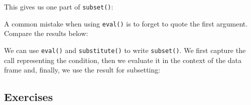 This gives us one part of \texttt{subset()}:

\begin{Shaded}
\begin{Highlighting}[]
\NormalTok{(}\StringTok{ }
\NormalTok{(}\StringTok{ }
\end{Highlighting}
\end{Shaded}

A common mistake when using \texttt{eval()} is to forget to quote the
first argument. Compare the results below:

\begin{Shaded}
\begin{Highlighting}[]
\StringTok{ }
\NormalTok{(}

\NormalTok{(}
\end{Highlighting}
\end{Shaded}

We can use \texttt{eval()} and \texttt{substitute()} to write
\texttt{subset()}. We first capture the call representing the condition,
then we evaluate it in the context of the data frame and, finally, we
use the result for subsetting:

\begin{Shaded}
\begin{Highlighting}[]
\StringTok{ }
  \StringTok{ }
  \StringTok{ }
\NormalTok{\}}
\StringTok{ }\NormalTok{)}
\end{Highlighting}
\end{Shaded}

\subsection{Exercises}

